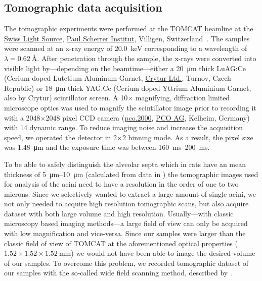 \documentclass[%
	twoside,
	paper=a4,%
	abstract=true,%
	]{scrartcl}
\begin{document}
\subsection{Tomographic data acquisition}
The tomographic experiments were performed at the \href{http://www.psi.ch/sls/tomcat/}{TOMCAT beamline} at the \href{http://www.psi.ch/sls/}{Swiss Light Source}, \href{http://www.psi.ch/}{Paul Scherrer Institut}, Villigen, Switzerland~\cite{Stampanoni2006a}. The samples were scanned at an x-ray energy of \SI{20.0}{\kilo\electronvolt} corresponding to a wavelength of \(\lambda=\SI{0.62}{\angstrom}\). %
After penetration through the sample, the x-rays were converted into visible light by---depending on the beamtime---either a \SI{20}{\micro\meter} thick LuAG:Ce (Cerium doped Lutetium Aluminum Garnet, \href{http://www.crytur.cz/}{Crytur Ltd.}, Turnov, Czech Republic) or \SI{18}{\micro\meter} thick YAG:Ce (Cerium doped Yttrium Aluminium Garnet, also by Crytur) scintillator screen. A 10\(\times\) magnifying, diffraction limited microscope optics was used to magnify the scintillator image prior to recording it with a 2048\(\times\)2048 pixel CCD camera (\href{http://www.pco.de/sensitive-cameras/pco2000/}{pco.2000}, \href{http://www.pco.de/}{PCO AG}, Kelheim, Germany) with \SI{14}{\bit} dynamic range. To reduce imaging noise and increase the acquisition speed, we operated the detector in 2\(\times\)2 binning mode. As a result, the pixel size was \SI{1.48}{\micro\meter} and the exposure time was between \SIrange{160}{200}{\milli\second}.

To be able to safely distinguish the alveolar septa which in rats have an mean thickness of \SIrange{5}{10}{\micro\meter} (calculated from data in \citet{Burri1974}) the tomographic images used for analysis of the acini need to have a resolution in the order of one to two microns. Since we selectively wanted to extract a large amount of single acini, we not only needed to acquire high resolution tomographic scans, but also acquire dataset with both large volume and high resolution. Usually---with classic microscopy based imaging methods---a large field of view can only be acquired with low magnification and vice-versa. Since our samples were larger than the classic field of view of TOMCAT at the aforementioned optical properties (\(1.52\times1.52\times\SI{1.52}{\milli\meter}\)) we would not have been able to image the desired volume of our samples. To overcome this problem, we recorded tomographic dataset of our samples with the so-called wide field scanning method, described by \citet{Haberthuer2010a}.
\end{document}
